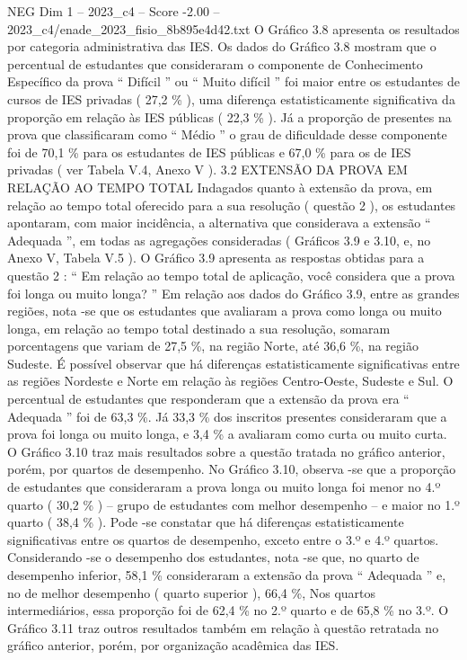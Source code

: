 \begin{textsample}{NEG Dim 1 – 2023\_c4 – Score -2.00 – 2023\_c4/enade\_2023\_fisio\_8b895e4d42.txt}
O Gráfico 3.8 apresenta os resultados por categoria administrativa das IES.
Os dados do Gráfico 3.8 mostram que o percentual de estudantes que consideraram o componente de Conhecimento Específico da prova “ Difícil ” ou “ Muito difícil ” foi maior entre os estudantes de cursos de IES privadas ( 27,2 \% ), uma diferença estatisticamente significativa da proporção em relação às IES públicas ( 22,3 \% ).
Já a proporção de presentes na prova que classificaram como “ Médio ” o grau de dificuldade desse componente foi de 70,1 \% para os estudantes de IES públicas e 67,0 \% para os de IES privadas ( ver Tabela V.4, Anexo V ). 3.2 EXTENSÃO DA PROVA EM RELAÇÃO AO TEMPO TOTAL Indagados quanto à extensão da prova, em relação ao tempo total oferecido para a sua resolução ( questão 2 ), os estudantes apontaram, com maior incidência, a alternativa que considerava a extensão “ Adequada ”, em todas as agregações consideradas ( Gráficos 3.9 e 3.10, e, no Anexo V, Tabela V.5 ).
O Gráfico 3.9 apresenta as respostas obtidas para a questão 2 : “ Em relação ao tempo total de aplicação, você considera que a prova foi longa ou muito longa? ” Em relação aos dados do Gráfico 3.9, entre as grandes regiões, nota -se que os estudantes que avaliaram a prova como longa ou muito longa, em relação ao tempo total destinado a sua resolução, somaram porcentagens que variam de 27,5 \%, na região Norte, até 36,6 \%, na região Sudeste.
É possível observar que há diferenças estatisticamente significativas entre as regiões Nordeste e Norte em relação às regiões Centro-Oeste, Sudeste e Sul.
O percentual de estudantes que responderam que a extensão da prova era “ Adequada ” foi de 63,3 \%.
Já 33,3 \% dos inscritos presentes consideraram que a prova foi longa ou muito longa, e 3,4 \% a avaliaram como curta ou muito curta.
O Gráfico 3.10 traz mais resultados sobre a questão tratada no gráfico anterior, porém, por quartos de desempenho.
No Gráfico 3.10, observa -se que a proporção de estudantes que consideraram a prova longa ou muito longa foi menor no 4.º quarto ( 30,2 \% ) – grupo de estudantes com melhor desempenho – e maior no 1.º quarto ( 38,4 \% ).
Pode -se constatar que há diferenças estatisticamente significativas entre os quartos de desempenho, exceto entre o 3.º e 4.º quartos.
Considerando -se o desempenho dos estudantes, nota -se que, no quarto de desempenho inferior, 58,1 \% consideraram a extensão da prova “ Adequada ” e, no de melhor desempenho ( quarto superior ), 66,4 \%, Nos quartos intermediários, essa proporção foi de 62,4 \% no 2.º quarto e de 65,8 \% no 3.º.
O Gráfico 3.11 traz outros resultados também em relação à questão retratada no gráfico anterior, porém, por organização acadêmica das IES.

\end{textsample}
